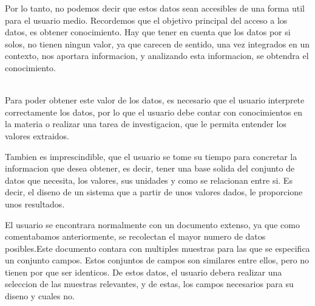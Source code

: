 Por lo tanto, no podemos decir que estos datos sean accesibles de una forma util para el usuario medio. 
Recordemos que el objetivo principal del acceso a los datos, es obtener conocimiento. Hay que tener en 
cuenta que los datos por si solos, no tienen ningun valor, ya que carecen de sentido, una vez integrados en un contexto,
nos aportara informacion, y analizando esta informacion, se obtendra el conocimiento.\\
    
    
    \\
Para poder obtener este valor de los datos, es necesario que el usuario interprete correctamente los datos, por lo
que el usuario debe contar con conocimientos en la materia o realizar una tarea de investigacion, que le permita 
entender los valores extraidos. 
    
    
Tambien es imprescindible, que el usuario se tome su tiempo para concretar la informacion que desea
obtener, es decir, tener una base solida del conjunto de datos que necesita, los valores,
sus unidades y como se relacionan entre si. Es decir, el diseno de un sistema que a partir de unos valores dados,
le proporcione unos resultados.
    

El usuario se encontrara normalmente con un documento extenso, ya que como comentabamos anteriormente, se recolectan
el mayor numero de datos posibles.Este documento contara con multiples muestras para las que
se especifica un conjunto campos. Estos conjuntos de campos son similares entre ellos, pero no tienen por que ser identicos. 
De estos datos, el usuario debera realizar una seleccion de las muestras relevantes, y de estas, los campos necesarios
para su diseno y cuales no.

